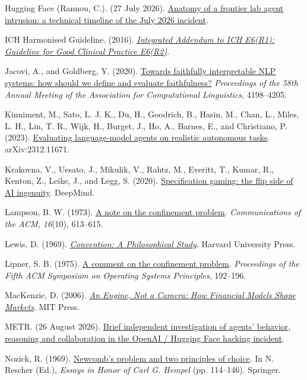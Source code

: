 \documentclass[11pt,letterpaper]{article}
\begin{document}
Hugging Face (Rannou, C.). (27 July 2026). \href{https://huggingface.co/blog/agent-intrusion-technical-timeline}{Anatomy of a frontier lab agent intrusion: a technical timeline of the July 2026 incident}.

ICH Harmonised Guideline. (2016). \textit{\href{https://database.ich.org/sites/default/files/E6_R2_Addendum.pdf}{Integrated Addendum to ICH E6(R1): Guideline for Good Clinical Practice E6(R2)}}.

Jacovi, A., and Goldberg, Y. (2020). \href{https://doi.org/10.18653/v1/2020.acl-main.386}{Towards faithfully interpretable NLP systems: how should we define and evaluate faithfulness?} \textit{Proceedings of the 58th Annual Meeting of the Association for Computational Linguistics}, 4198–4205.

Kinniment, M., Sato, L. J. K., Du, H., Goodrich, B., Hasin, M., Chan, L., Miles, L. H., Lin, T. R., Wijk, H., Burget, J., Ho, A., Barnes, E., and Christiano, P. (2023). \href{https://arxiv.org/abs/2312.11671}{Evaluating language-model agents on realistic autonomous tasks}. arXiv:2312.11671.

Krakovna, V., Uesato, J., Mikulik, V., Rahtz, M., Everitt, T., Kumar, R., Kenton, Z., Leike, J., and Legg, S. (2020). \href{https://deepmind.google/discover/blog/specification-gaming-the-flip-side-of-ai-ingenuity/}{Specification gaming: the flip side of AI ingenuity}. DeepMind.

Lampson, B. W. (1973). \href{https://doi.org/10.1145/362375.362389}{A note on the confinement problem}. \textit{Communications of the ACM, 16}(10), 613–615.

Lewis, D. (1969). \textit{\href{https://books.google.com/books?id=8sPXAAAAMAAJ}{Convention: A Philosophical Study}}. Harvard University Press.

Lipner, S. B. (1975). \href{https://doi.org/10.1145/800213.806537}{A comment on the confinement problem}. \textit{Proceedings of the Fifth ACM Symposium on Operating Systems Principles}, 192–196.

MacKenzie, D. (2006). \textit{\href{https://doi.org/10.7551/mitpress/9780262134606.001.0001}{An Engine, Not a Camera: How Financial Models Shape Markets}}. MIT Press.

METR. (26 August 2026). \href{https://metr.org/blog/2026-08-26-openai-hugging-face-incident-investigation/}{Brief independent investigation of agents’ behavior, reasoning and collaboration in the OpenAI / Hugging Face hacking incident}.

Nozick, R. (1969). \href{https://doi.org/10.1007/978-94-017-1466-2_7}{Newcomb's problem and two principles of choice}. In N. Rescher (Ed.), \textit{Essays in Honor of Carl G. Hempel} (pp. 114–146). Springer.
\end{document}
